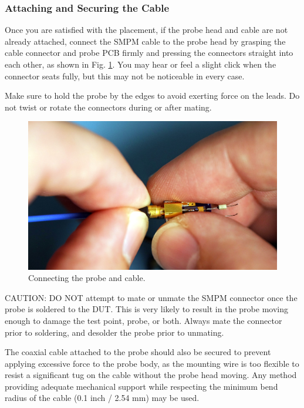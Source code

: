 \documentclass[11pt]{article}
\begin{document}
\FloatBarrier

\subsubsection{Attaching and Securing the Cable}

Once you are satisfied with the placement, if the probe head and cable are not already attached, connect the SMPM cable
to the probe head by grasping the cable connector and probe PCB firmly and pressing the connectors straight into each
other, as shown in Fig. \ref{smpm-mating}. You may hear or feel a slight click when the connector seats fully, but this
may not be noticeable in every case.

Make sure to hold the probe by the edges to avoid exerting force on the leads. Do not twist or rotate the connectors
during or after mating.

\begin{figure}[h]
\centering
\includegraphics[width=12cm]{smpm-mating.jpg}
\caption{Connecting the probe and cable.}
\label{smpm-mating}
\end{figure}

CAUTION: DO NOT attempt to mate or unmate the SMPM connector once the probe is soldered to the DUT. This is very likely
to result in the probe moving enough to damage the test point, probe, or both. Always mate the connector prior to
soldering, and desolder the probe prior to unmating.

The coaxial cable attached to the probe should also be secured to prevent applying excessive force to the probe body,
as the mounting wire is too flexible to resist a significant tug on the cable without the probe head moving. Any method
providing adequate mechanical support while respecting the minimum bend radius of the cable (0.1 inch / 2.54 mm) may be
used.
\end{document}
